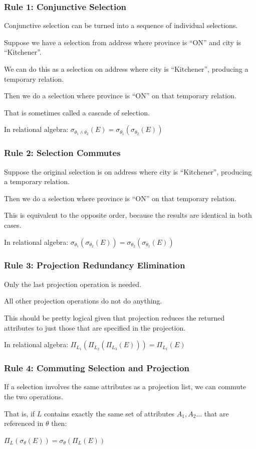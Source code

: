 \begin{frame}
\frametitle{Rule 1: Conjunctive Selection}

Conjunctive selection can be turned into a sequence of individual selections.

Suppose we have a selection from address where province is ``ON'' and city is ``Kitchener''. 

We can do this as a selection on address where city is ``Kitchener'', producing a temporary relation. 

Then we do a selection where province is ``ON'' on that temporary relation. 

That is sometimes called a cascade of selection.

In relational algebra: $\sigma_{\theta_{1} \wedge \theta_{2}}(E) = \sigma_{\theta_{1}}(\sigma_{\theta_{2}}(E))$


\end{frame}


\begin{frame}
\frametitle{Rule 2: Selection Commutes}

Suppose the original selection is on address where city is ``Kitchener'', producing a temporary relation. 

Then we do a selection where province is ``ON'' on that temporary relation. 

This is equivalent to the opposite order, because the results are identical in both cases. 

In relational algebra: $\sigma_{\theta_{1}}(\sigma_{\theta_{2}}(E)) = \sigma_{\theta_{2}}(\sigma_{\theta_{1}}(E))$


\end{frame}

\begin{frame}
\frametitle{Rule 3: Projection Redundancy Elimination}

Only the last projection operation is needed. 

All other projection operations do not do anything. 

This should be pretty logical given that projection reduces the returned attributes to just those that are specified in the projection.

In relational algebra: $\Pi_{L_{1}}(\Pi_{L_{2}}(\Pi_{L_{3}}(E))) = \Pi_{L_{1}}(E)$

\end{frame}


\begin{frame}
\frametitle{Rule 4: Commuting Selection and Projection}

If a selection involves the same attributes as a projection list, we can commute the two operations. 

That is, if $L$ contains exactly the same set of attributes $A_{1}, A_{2}...$ that are referenced in $\theta$ then:

$\Pi_{L}(\sigma_{\theta}(E)) = \sigma_{\theta}(\Pi_{L}(E))$



\end{frame}

